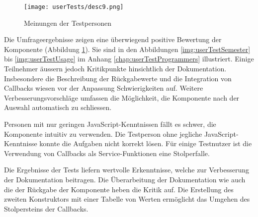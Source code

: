 \begin{figure}[!htb]
    \centering
    \texttt{[image: userTests/desc9.png]}
    \caption{\centering Meinungen der Testpersonen}
    \label{img:userTestsDescription}
\end{figure}

Die Umfrageergebnisse zeigen eine überwiegend positive Bewertung der Komponente (Abbildung \ref{img:userTestsDescription}). 
Sie sind in den Abbildungen \ref{img:userTestSemester} bis \ref{img:userTestUsage} im Anhang \ref{chap:userTestProgrammers} illustriert. 
Einige Teilnehmer äussern jedoch Kritikpunkte hinsichtlich der Dokumentation. 
Insbesondere die Beschreibung der Rückgabewerte und die Integration von Callbacks wiesen vor der Anpassung Schwierigkeiten auf. 
Weitere Verbesserungsvorschläge umfassen die Möglichkeit, die Komponente nach der Auswahl automatisch zu schliessen. 

Personen mit nur geringen JavaScript-Kenntnissen fällt es schwer, die Komponente intuitiv zu verwenden. 
Die Testperson ohne jegliche JavaScript-Kenntnisse konnte die Aufgaben nicht korrekt lösen. 
Für einige Testnutzer ist die Verwendung von Callbacks als Service-Funktionen eine Stolperfalle. 

Die Ergebnisse der Tests liefern wertvolle Erkenntnisse, welche zur Verbesserung der Dokumentation beitragen. 
Die Überarbeitung der Dokumentation wie auch die der Rückgabe der Komponente heben die Kritik auf. 
Die Erstellung des zweiten Konstruktors mit einer Tabelle von Werten ermöglicht das Umgehen des Stolpersteins der Callbacks. 

